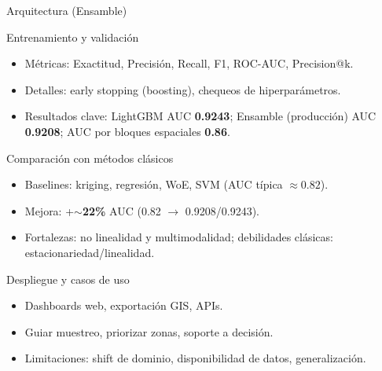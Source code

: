 \documentclass[aspectratio=169]{beamer}
\begin{document}
\begin{frame}{Arquitectura (Ensamble)}
  \centering
  \resizebox{\textwidth}{!}{}
\end{frame}

\begin{frame}{Entrenamiento y validación}
  \begin{itemize}
    \item Métricas: Exactitud, Precisión, Recall, F1, ROC-AUC, Precision@k.
    \item Detalles: early stopping (boosting), chequeos de hiperparámetros.
    \item Resultados clave: LightGBM AUC \textbf{0.9243}; Ensamble (producción) AUC \textbf{0.9208}; AUC por bloques espaciales \textbf{0.86}.
  \end{itemize}
\end{frame}

\begin{frame}{Comparación con métodos clásicos}
  \begin{itemize}
    \item Baselines: kriging, regresión, WoE, SVM (AUC típica \(\approx 0.82\)).
    \item Mejora: +\(\sim\)\textbf{22\%} AUC (0.82 \(\to\) 0.9208/0.9243).
    \item Fortalezas: no linealidad y multimodalidad; debilidades clásicas: estacionariedad/linealidad.
  \end{itemize}
\end{frame}

\begin{frame}{Despliegue y casos de uso}
  \begin{itemize}
    \item Dashboards web, exportación GIS, APIs.
    \item Guiar muestreo, priorizar zonas, soporte a decisión.
    \item Limitaciones: shift de dominio, disponibilidad de datos, generalización.
  \end{itemize}
\end{frame}
\end{document}
